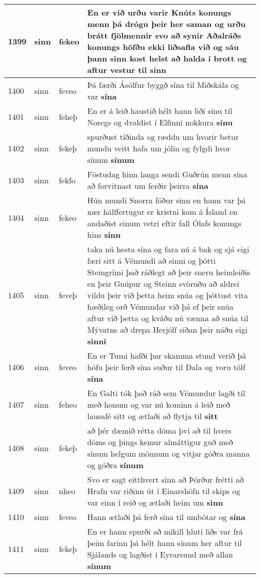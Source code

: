 \documentclass{article}
\begin{document}
\begin{longtable}{p{1cm}|p{1cm}|p{1cm}|p{13cm}}
\hline
1399&sinn&fekeo&En er við urðu varir Knúts konungs menn þá drógu þeir her saman og urðu brátt fjölmennir svo að synir Aðalráðs konungs höfðu ekki liðsafla við og sáu þann sinn kost helst að halda í brott og aftur vestur til \textbf{sinn} \\
\hline
1400&sinn&feveo&Þá færði Ásólfur byggð sína til Miðskála og var \textbf{sína} \\
\hline
1401&sinn&feheþ&En er á leið haustið hélt hann liði sínu til Noregs og dvaldist í Elfinni nokkura \textbf{sínu} \\
\hline
1402&sinn&fekeþ&spurðust tíðinda og ræddu um hvorir betur mundu veitt hafa um jólin og fylgdi hvor sínum \textbf{sínum} \\
\hline
1403&sinn&fekfo&Föstudag hinn langa sendi Guðrún menn sína að forvitnast um ferðir þeirra \textbf{sína} \\
\hline
1404&sinn&fekeo&Hún mundi Snorra föður sinn en hann var þá nær hálffertugur er kristni kom á Ísland en andaðist einum vetri eftir fall Ólafs konungs hins \textbf{sinn} \\
\hline
1405&sinn&feveþ&taka nú hesta sína og fara nú á bak og sjá eigi færi sitt á Vémundi að sinni og þótti Steingrími það ráðlegt að þeir sneru heimleiðis en þeir Gnúpur og Steinn svöruðu að aldrei vildu þeir við þetta heim snúa og þóttust vita hæðileg orð Vémundar við þá ef þeir snúa aftur við þetta og kváðu nú vænna að snúa til Mývatns að drepa Herjólf síðan þeir náðu eigi \textbf{sinni} \\
\hline
1406&sinn&feveo&En er Tumi hafði þar skamma stund verið þá hófu þeir ferð sína suður til Dala og voru tólf \textbf{sína} \\
\hline
1407&sinn&feheo&En Galti tók það ráð sem Vémundur lagði til með honum og var nú kominn á leið með lausafé sitt og ætlaði að flytja til \textbf{sitt} \\
\hline
1408&sinn&fekeþ&að þér dæmið rétta dóma því að til hvers dóms og þings kemur almáttigur guð með sínum helgum mönnum og vitjar góðra manna og góðra \textbf{sínum} \\
\hline
1409&sinn&nheo&Svo er sagt eitthvert sinn að Þórður frétti að Hrafn var riðinn út í Einarshöfn til skips og var einn í reið og ætlaði heim um \textbf{sinn} \\
\hline
1410&sinn&feveo&Hann ætlaði þá ferð sína til umbótar og \textbf{sína} \\
\hline
1411&sinn&fekeþ&En er hann spurði að mikill hluti liðs var frá þeim farinn þá hélt hann sínum her aftur til Sjálands og lagðist í Eyrarsund með allan \textbf{sínum} \\

\end{longtable}
\end{document}
